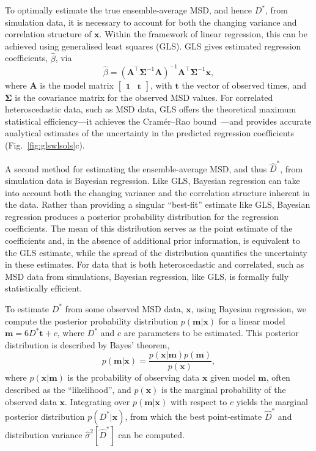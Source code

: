 \documentclass[reprint,superscriptaddress,nobibnotes,amsmath,amssymb,aps,prx,hidelinks]{revtex4-2}
\newcommand{\oMSD}{\ensuremath{\bm{x}}}
\newcommand{\modelmatrix}{\mathbf{A}}
\newcommand{\model}{\bm{m}}
\newcommand{\prob}[1]{\ensuremath{p(#1)}}
\newcommand{\Dest}{\ensuremath{\widehat{D}^*}}
\newcommand{\D}{\ensuremath{D^*}}
\newcommand{\varest}[1]{\ensuremath{\widehat{\sigma}^2[#1]}}
\begin{document}
To optimally estimate the true ensemble-average MSD, and hence $\D$, from simulation data, it is necessary to account for both the changing variance and correlation structure of $\oMSD$.
Within the framework of linear regression, this can be achieved using generalised least squares (GLS).
GLS gives estimated regression coefficients, $\widehat{\beta}$, via
%
\begin{equation}
    \widehat{\beta} = \left(\modelmatrix^{\top}\mathbf{\Sigma}^{-1}\modelmatrix\right)^{-1}\modelmatrix^{\top}\mathbf{\Sigma}^{-1}\oMSD,
    \label{equ:gls}
\end{equation} 
%
where $\modelmatrix$ is the model matrix $\begin{bmatrix}\mathbf{1} & \bm{t}\end{bmatrix}$, with $\bm{t}$ the vector of observed times, and $\mathbf{\Sigma}$ is the covariance matrix for the observed MSD values.
For correlated heteroscedastic data, such as MSD data, GLS offers the theoretical maximum statistical efficiency---it achieves the Cram\'er--Rao bound~\cite{cramer_mathematical_1946,rao_information_1945,rao_selected_1994,darmois_sur_1945,aitken_on_1942}---and provides accurate analytical estimates of the uncertainty in the predicted regression coefficients (Fig.~\ref{fig:glswlsols}c).

A second method for estimating the ensemble-average MSD, and thus $\Dest$, from simulation data is Bayesian regression.
Like GLS, Bayesian regression can take into account both the changing variance and the correlation structure inherent in the data.
Rather than providing a singular ``best-fit'' estimate like GLS, Bayesian regression produces a posterior probability distribution for the regression coefficients.
The mean of this distribution serves as the point estimate of the coefficients and, in the absence of additional prior information, is equivalent to the GLS estimate, while the spread of the distribution quantifies the uncertainty in these estimates.
For data that is both heteroscedastic and correlated, such as MSD data from simulations, Bayesian regression, like GLS, is formally fully statistically efficient.

To estimate $\D$ from some observed MSD data, $\oMSD$, using Bayesian regression, we compute the posterior probability distribution $\prob{\model|\oMSD}$ for a linear model $\model = 6\D \bm{t} + c$, where $\D$ and $c$ are parameters to be estimated.
This posterior distribution is described by Bayes' theorem,
%
\begin{equation}
    \prob{\model|\oMSD} = \frac{\prob{{\oMSD|\model}}\prob{\model}}{\prob{\oMSD}},
    \label{equ:bayes}
\end{equation}
%
where $\prob{\oMSD|\model}$ is the probability of observing data $\oMSD$ given model $\model$, often described as the ``likelihood'', and $\prob{\oMSD}$ is the marginal probability of the observed data $\oMSD$.
Integrating over $\prob{\model|\oMSD}$ with respect to $c$ yields the marginal posterior distribution $\prob{\D|\oMSD}$, from which the best point-estimate $\Dest$ and distribution variance $\varest{\Dest}$ can be computed.
\end{document}
